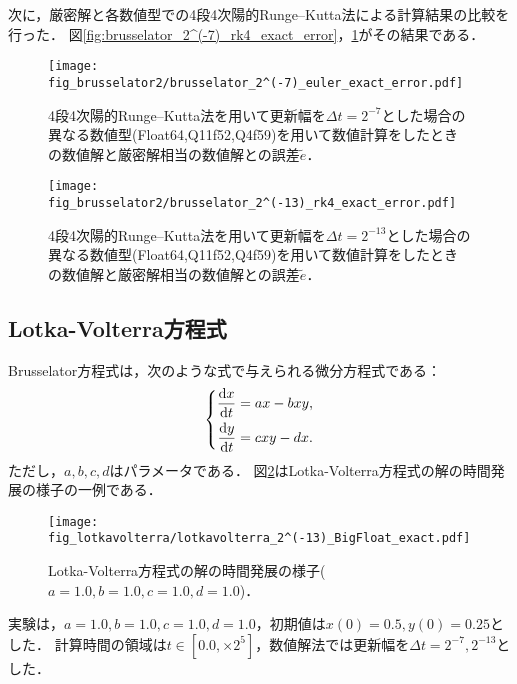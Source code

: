 次に，厳密解と各数値型での4段4次陽的Runge--Kutta法による計算結果の比較を行った．
図\ref{fig:brusselator_2^(-7)_rk4_exact_error}，\ref{fig:brusselator_2^(-13)_rk4_exact_error}がその結果である．\\
\begin{figure}[H]
    \centering
    \begin{minipage}[b]{0.48\columnwidth}
        \centering
        \texttt{[image: fig\_brusselator2/brusselator\_2^(-7)\_euler\_exact\_error.pdf]}
        \caption{4段4次陽的Runge--Kutta法を用いて更新幅を$\Delta t = 2^{-7}$とした場合の異なる数値型(Float64,Q11f52,Q4f59)を用いて数値計算をしたときの数値解と厳密解相当の数値解との誤差$\tilde{e}$．}
        \label{fig:brusselator_2^(-7)_rk4_exact_error}
    \end{minipage}
    \hspace{0.01\columnwidth}
    \begin{minipage}[b]{0.48\columnwidth}
        \centering
        \texttt{[image: fig\_brusselator2/brusselator\_2^(-13)\_rk4\_exact\_error.pdf]}
        \caption{4段4次陽的Runge--Kutta法を用いて更新幅を$\Delta t =  2^{-13}$とした場合の異なる数値型(Float64,Q11f52,Q4f59)を用いて数値計算をしたときの数値解と厳密解相当の数値解との誤差$\tilde{e}$．}
        \label{fig:brusselator_2^(-13)_rk4_exact_error}
    \end{minipage}
\end{figure}

\subsection{Lotka-Volterra方程式}
Brusselator方程式は，次のような式で与えられる微分方程式である：
\begin{align*}
    \left\{
    \begin{aligned}        
        \frac{\mathrm{d}x}{\mathrm{d}t} &=  ax - bxy,\\
        \frac{\mathrm{d}y}{\mathrm{d}t} &= cxy - dx.
    \end{aligned}
    \right.
\end{align*}
ただし，$a,b,c,d$はパラメータである．
図\ref{fig:lotkavolterra}はLotka-Volterra方程式の解の時間発展の様子の一例である．
\begin{figure}[H]
    \centering
    \begin{minipage}[b]{0.9\columnwidth}
            \texttt{[image: fig\_lotkavolterra/lotkavolterra\_2^(-13)\_BigFloat\_exact.pdf]}
    \end{minipage}
    \caption{Lotka-Volterra方程式の解の時間発展の様子($a=1.0, b=1.0, c=1.0, d=1.0$)．}
    \label{fig:lotkavolterra}
\end{figure}
実験は，$a=1.0, b=1.0, c=1.0, d=1.0$，初期値は$x(0) = 0.5, y(0) = 0.25$とした．
計算時間の領域は$t \in [0.0, \times 2^5]$，数値解法では更新幅を$\Delta t =  2^{-7}, 2^{-13}$とした．


